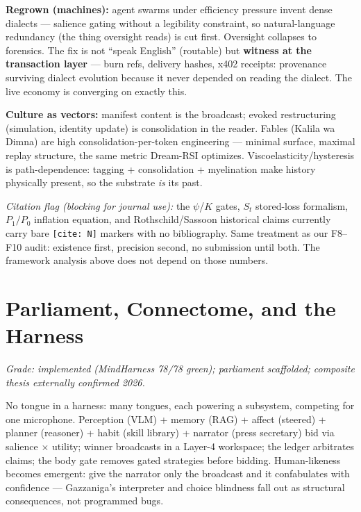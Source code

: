 \documentclass[11pt]{article}
\begin{document}
\textbf{Regrown (machines):} agent swarms under efficiency pressure invent dense dialects --- salience gating without a legibility constraint, so natural-language redundancy (the thing oversight reads) is cut first. Oversight collapses to forensics. The fix is not ``speak English'' (routable) but \textbf{witness at the transaction layer} --- burn refs, delivery hashes, x402 receipts: provenance surviving dialect evolution because it never depended on reading the dialect. The live economy is converging on exactly this.

\textbf{Culture as vectors:} manifest content is the broadcast; evoked restructuring (simulation, identity update) is consolidation in the reader. Fables (Kalila wa Dimna) are high consolidation-per-token engineering --- minimal surface, maximal replay structure, the same metric Dream-RSI optimizes. Viscoelasticity/hysteresis is path-dependence: tagging + consolidation + myelination make history physically present, so the substrate \emph{is} its past.

\textit{Citation flag (blocking for journal use):} the $\psi$/$K$ gates, $S_t$ stored-loss formalism, $P_1/P_0$ inflation equation, and Rothschild/Sassoon historical claims currently carry bare \texttt{[cite: N]} markers with no bibliography. Same treatment as our F8--F10 audit: existence first, precision second, no submission until both. The framework analysis above does not depend on those numbers.

\section{Parliament, Connectome, and the Harness}
\label{sec:harness}

\textit{Grade: implemented (MindHarness 78/78 green); parliament scaffolded; composite thesis externally confirmed 2026.}

No tongue in a harness: many tongues, each powering a subsystem, competing for one microphone. Perception (VLM) + memory (RAG) + affect (steered) + planner (reasoner) + habit (skill library) + narrator (press secretary) bid via salience $\times$ utility; winner broadcasts in a Layer-4 workspace; the ledger arbitrates claims; the body gate removes gated strategies before bidding. Human-likeness becomes emergent: give the narrator only the broadcast and it confabulates with confidence --- Gazzaniga's interpreter and choice blindness fall out as structural consequences, not programmed bugs.
\end{document}

